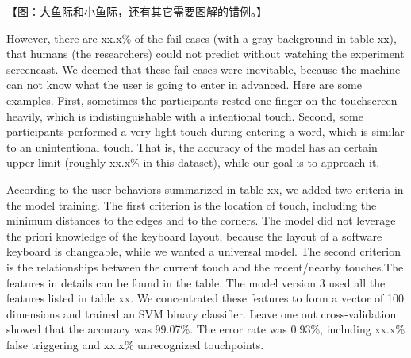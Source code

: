 【图：大鱼际和小鱼际，还有其它需要图解的错例。】


However, there are xx.x\% of the fail cases (with a gray background in table xx), that humans (the researchers) could not predict without watching the experiment screencast. We deemed that these fail cases were inevitable, because the machine can not know what the user is going to enter in advanced. Here are some examples. First, sometimes the participants rested one finger on the touchscreen heavily, which is indistinguishable with a intentional touch. Second, some participants performed a very light touch during entering a word, which is similar to an unintentional touch. That is, the accuracy of the model has an certain upper limit (roughly xx.x\% in this dataset), while our goal is to approach it.


According to the user behaviors summarized in table xx, we added two criteria in the model training. The first criterion is the location of touch, including the minimum distances to the edges and to the corners. The model did not leverage the priori knowledge of the keyboard layout, because the layout of a software keyboard is changeable, while we wanted a universal model. The second criterion is the relationships between the current touch and the recent/nearby touches.The features in details can be found in the table. The model version 3 used all the features listed in table xx. We concentrated these features to form a vector of 100 dimensions and trained an SVM binary classifier. Leave one out cross-validation showed that the accuracy was 99.07\%. The error rate was 0.93\%, including xx.x\% false triggering and xx.x\% unrecognized touchpoints.

